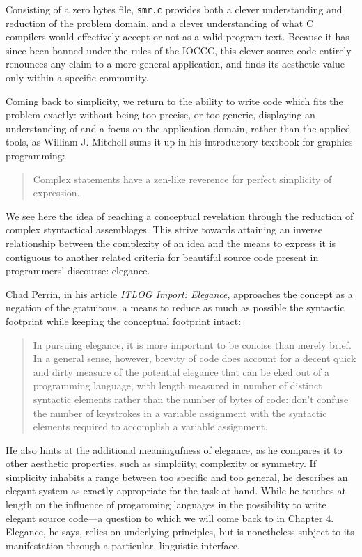 Consisting of a zero bytes file, \lstinline{smr.c} provides both a clever understanding and reduction of the problem domain, and a clever understanding of what C compilers would effectively accept or not as a valid program-text\cite{kanakarakis_international_2022a}. Because it has since been banned under the rules of the IOCCC, this clever source code entirely renounces any claim to a more general application, and finds its aesthetic value only within a specific community.

Coming back to simplicity, we return to the ability to write code which fits the problem exactly: without being too precise, or too generic, displaying an understanding of and a focus on the application domain, rather than the applied tools, as William J. Mitchell sums it up in his introductory textbook for graphics programming:

\begin{quote}
  Complex statements have a zen-like reverence for perfect simplicity of expression.\cite{mitchell_art_1987}
\end{quote}

We see here the idea of reaching a conceptual revelation through the reduction of complex styntactical assemblages. This strive towards attaining an inverse relationship between the complexity of an idea and the means to express it is contiguous to another related criteria for beautiful source code present in programmers' discourse: elegance.

Chad Perrin, in his article \emph{ITLOG Import: Elegance}, approaches the concept as a negation of the gratuitous, a means to reduce as much as possible the syntactic footprint while keeping the conceptual footprint intact:

\begin{quote}
  In pursuing elegance, it is more important to be concise than merely brief. In a general sense, however, brevity of code does account for a decent quick and dirty measure of the potential elegance that can be eked out of a programming language, with length measured in number of distinct syntactic elements rather than the number of bytes of code: don't confuse the number of keystrokes in a variable assignment with the syntactic elements required to accomplish a variable assignment.\cite{perrin_itlog_2006}
\end{quote}

He also hints at the additional meaningufness of elegance, as he compares it to other aesthetic properties, such as simplciity, complexity or symmetry. If simplicity inhabits a range between too specific and too general, he describes an elegant system as exactly appropriate for the task at hand. While he touches at length on the influence of progamming languages in the possibility to write elegant source code—a question to which we will come back to in Chapter 4. Elegance, he says, relies on underlying principles, but is nonetheless subject to its manifestation through a particular, linguistic interface.

